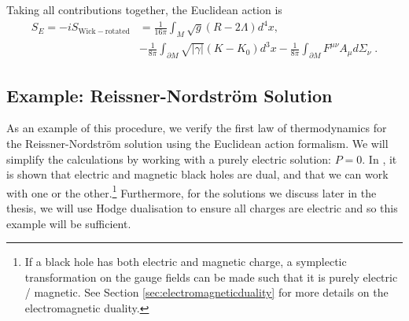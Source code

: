 Taking all contributions together, the Euclidean action is 
\begin{equation}
\label{eq:euclact}
\begin{aligned}
            S_E = -i S_{\mathrm{Wick-rotated}}
        &= \frac{1}{16 \pi} \int_M \sqrt{g} (R - 2\Lambda) d^4 x , \\
        &- \frac{1}{8 \pi} \int_{\partial M} \sqrt{|\gamma|} (K - K_0) d^3x - \frac{1}{8 \pi} \int_{\partial M} F^{\mu \nu} A_{\mu} d\Sigma_{\nu} \;.
\end{aligned}
\end{equation}

\subsection*{Example: Reissner-Nordstr\"om Solution}

As an example of this procedure, we verify the first law of thermodynamics for the Reissner-Nordstr\"om solution using the Euclidean action formalism. We will simplify the calculations by working with a purely electric solution: $P = 0$. In \cite{Hawking:1995ap}, it is shown that electric and magnetic black holes are dual, and that we can work with one or the other.\footnote{If a black hole has both electric and magnetic charge, a symplectic transformation on the gauge fields can be made such that it is purely electric / magnetic. See Section \ref{sec:electromagneticduality} for more details on the electromagnetic duality.} Furthermore, for the solutions we discuss later in the thesis, we will use Hodge dualisation to ensure all charges are electric and so this example will be sufficient. 

